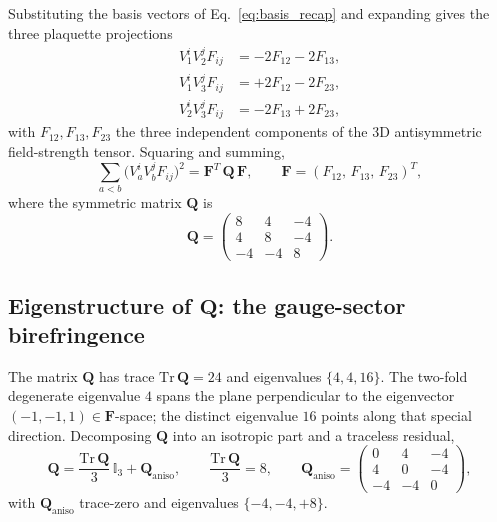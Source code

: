 Substituting the basis vectors of Eq.~\eqref{eq:basis_recap} and
expanding gives the three plaquette projections
\begin{align}
    V_1^i V_2^j F_{ij} &= -2 F_{12} - 2 F_{13},
    \label{eq:proj_12} \\
    V_1^i V_3^j F_{ij} &= +2 F_{12} - 2 F_{23},
    \label{eq:proj_13} \\
    V_2^i V_3^j F_{ij} &= -2 F_{13} + 2 F_{23},
    \label{eq:proj_23}
\end{align}
with $F_{12}, F_{13}, F_{23}$ the three independent components of the
3D antisymmetric field-strength tensor.  Squaring and summing,
\begin{equation}
    \sum_{a<b}\bigl(V_a^i V_b^j F_{ij}\bigr)^2
        = \mathbf{F}^{\!T}\,\mathbf{Q}\,\mathbf{F},
        \qquad
        \mathbf{F} = (F_{12},\, F_{13},\, F_{23})^{\!T},
    \label{eq:plaquette_sum_quadratic}
\end{equation}
where the symmetric matrix $\mathbf{Q}$ is
\begin{equation}
    \mathbf{Q}
        = \begin{pmatrix}
            8 & 4 & -4 \\
            4 & 8 & -4 \\
            -4 & -4 & 8
        \end{pmatrix}.
    \label{eq:Q_matrix}
\end{equation}

\subsection{Eigenstructure of $\mathbf{Q}$: the gauge-sector birefringence}
\label{subsec:induced_birefringence}

The matrix $\mathbf{Q}$ has trace $\mathrm{Tr}\,\mathbf{Q} = 24$ and
eigenvalues $\{4, 4, 16\}$.  The two-fold degenerate eigenvalue $4$
spans the plane perpendicular to the eigenvector
$(-1, -1, 1) \in \mathbf{F}$-space; the distinct eigenvalue $16$
points along that special direction.  Decomposing
$\mathbf{Q}$ into an isotropic part and a traceless residual,
\begin{equation}
    \mathbf{Q}
        = \frac{\mathrm{Tr}\,\mathbf{Q}}{3}\,\mathbb{I}_3
        + \mathbf{Q}_\text{aniso},
        \qquad
        \frac{\mathrm{Tr}\,\mathbf{Q}}{3} = 8,
        \qquad
        \mathbf{Q}_\text{aniso} = \begin{pmatrix}
            0 & 4 & -4 \\
            4 & 0 & -4 \\
            -4 & -4 & 0
        \end{pmatrix},
    \label{eq:Q_decomposition}
\end{equation}
with $\mathbf{Q}_\text{aniso}$ trace-zero and eigenvalues
$\{-4, -4, +8\}$.

